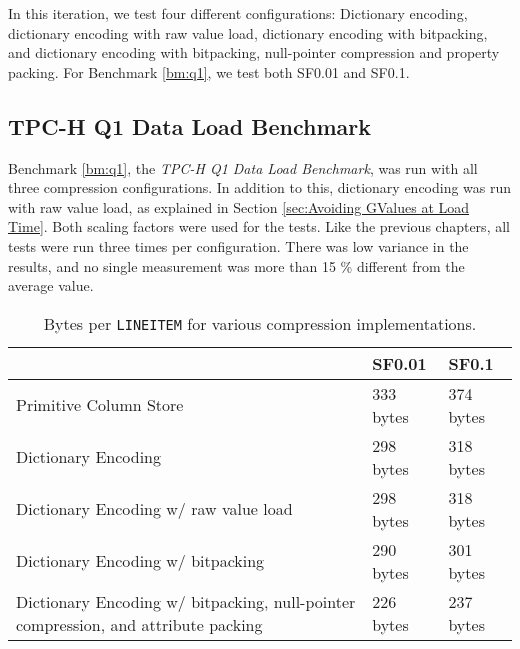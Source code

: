 In this iteration, we test four different configurations: Dictionary encoding, dictionary encoding with raw value load, dictionary encoding with bitpacking, and dictionary encoding with bitpacking, null-pointer compression and property packing. For Benchmark \ref{bm:q1}, we test both SF0.01 and SF0.1.


\subsection{TPC-H Q1 Data Load Benchmark}
Benchmark \ref{bm:q1}, the \textit{TPC-H Q1 Data Load Benchmark}, was run with all three compression configurations. In addition to this, dictionary encoding was run with raw value load, as explained in Section \ref{sec:Avoiding GValues at Load Time}. Both scaling factors were used for the tests. Like the previous chapters, all tests were run three times per configuration. There was low variance in the results, and no single measurement was more than 15 \% different from the average value.
\begin{table}
    \centering
    \begin{tabularx}{\textwidth}{X | X X}
        & SF0.01 & SF0.1 \\ 
        \hline
        \hline
        Primitive Column Store & 333 bytes & 374 bytes \\
        Dictionary Encoding & 298 bytes & 318 bytes \\
        Dictionary Encoding w/ raw value load & 298 bytes & 318 bytes \\
        Dictionary Encoding w/ bitpacking & 290 bytes & 301 bytes \\
        Dictionary Encoding w/ bitpacking, null-pointer compression, and attribute packing & 226 bytes & 237 bytes \\
    \end{tabularx}
    \caption{Bytes per \texttt{LINEITEM} for various compression implementations.} 
    \label{tab:dict-bpl}
\end{table}

